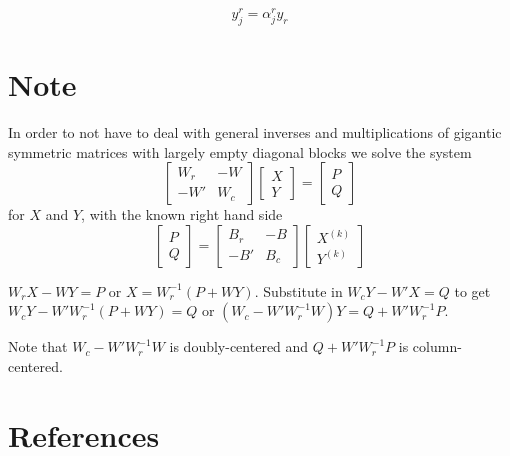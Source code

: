 \documentclass[
  12pt,
]{article}
\begin{document}
\[
y_j^r=\alpha_{j}^ry_r
\]

\section{Note}\label{note}

In order to not have to deal with general inverses and multiplications of gigantic symmetric matrices with largely empty diagonal blocks we solve the system
\[
\begin{bmatrix}
W_r&-W\\
-W'&W_c
\end{bmatrix}
\begin{bmatrix}
X\\Y
\end{bmatrix}
=
\begin{bmatrix}
P\\Q
\end{bmatrix}
\]
for \(X\) and \(Y\), with the known right hand side
\[
\begin{bmatrix}P\\Q\end{bmatrix}=
\begin{bmatrix}
B_r&-B\\
-B'&B_c
\end{bmatrix}
\begin{bmatrix}
X^{(k)}\\Y^{(k)}
\end{bmatrix}
\]

\(W_rX-WY=P\) or \(X=W_r^{-1}(P+WY)\). Substitute in \(W_cY-W'X=Q\)
to get \(W_cY-W'W_r^{-1}(P+WY)=Q\) or \((W_c-W'W_r^{-1}W)Y=Q+W'W_r^{-1}P\).

Note that \(W_c-W'W_r^{-1}W\) is doubly-centered and \(Q+W'W_r^{-1}P\) is column-centered.

\section*{References}\label{references}
\end{document}
